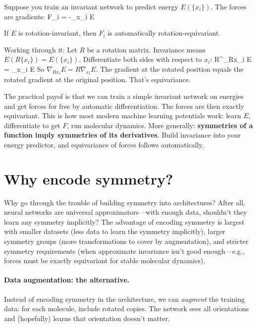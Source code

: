 \documentclass[11pt]{article}
\begin{document}
Suppose you train an invariant network to predict energy $E(\{x_i\})$. The forces are gradients:
\beq
F_i = -\nabla_{x_i} E
\eeq

If $E$ is rotation-invariant, then $F_i$ is automatically rotation-equivariant.

Working through it: Let $R$ be a rotation matrix. Invariance means $E(R\{x_i\}) = E(\{x_i\})$. Differentiate both sides with respect to $x_i$:
\beq
R^\top \nabla_{Rx_i} E = \nabla_{x_i} E
\eeq
So $\nabla_{Rx_i} E = R \nabla_{x_i} E$. The gradient at the rotated position equals the rotated gradient at the original position. That's equivariance.

The practical payof is that we can train a simple invariant network on energies and get forces for free by automatic differentiation. The forces are then exactly equivariant. This is how most modern machine learning potentials work: learn $E$, differentiate to get $F$, run molecular dynamics.
%
More generally: \textbf{symmetries of a function imply symmetries of its derivatives}. Build invariance into your energy predictor, and equivariance of forces follows automatically.

\section{Why encode symmetry?}

Why go through the trouble of building symmetry into architectures? After all, neural networks are universal approximators---with enough data, shouldn't they learn any symmetry implicitly? The advantage of encoding symmetry is largest with smaller datasets (less data to learn the symmetry implicitly), larger symmetry groups (more transformations to cover by augmentation), and stricter symmetry requirements (when approximate invariance isn't good enough---e.g., forces must be exactly equivariant for stable molecular dynamics).

\paragraph{Data augmentation: the alternative.} Instead of encoding symmetry in the architecture, we can \emph{augment} the training data: for each molecule, include rotated copies. The network sees all orientations and (hopefully) learns that orientation doesn't matter.
\end{document}
